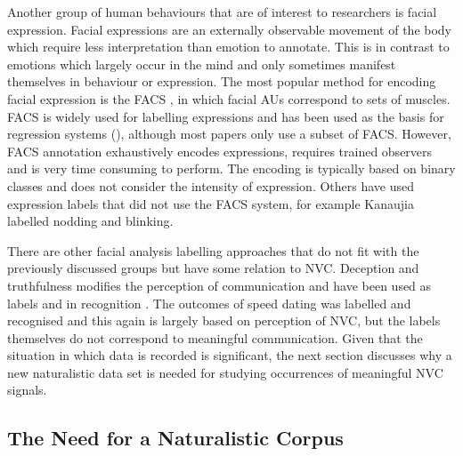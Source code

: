 Another group of human behaviours that are of interest to researchers is facial expression. Facial expressions are an externally observable movement of the body which require less interpretation than emotion to annotate. This is in contrast to emotions which largely occur in the mind and only sometimes manifest themselves in behaviour or expression. 
The most popular method for encoding facial expression is the \acf{FACS} \cite{Ekman1978}, in which facial \acf{AU}s correspond to sets of muscles. \ac{FACS} is widely used for labelling expressions and has been used as the basis for regression systems (\cite{Savran2012}), although most papers only use a subset of \ac{FACS}. However, \ac{FACS} annotation exhaustively encodes expressions, requires trained observers and is very time consuming to perform. The encoding is typically based on binary classes and does not consider the intensity of expression. 
Others have used expression labels that did not use the \ac{FACS} system, for example Kanaujia \etal \cite{Kanaujia2006} labelled nodding and blinking.


There are other facial analysis labelling approaches that do not fit with the previously discussed groups but have some relation to \ac{NVC}. Deception and truthfulness modifies the perception of communication and have been used as labels and in recognition \cite{Tsiamyrtzis07, Pfister2011}. 
The outcomes of speed dating was labelled and recognised \cite{Madan2003} and this again is largely based on perception of \ac{NVC}, but the labels themselves do not correspond to meaningful communication. 
Given that the situation in which data is recorded is significant, the next section discusses why a new naturalistic data set is needed for studying occurrences of meaningful \ac{NVC} signals.

\subsection{The Need for a Naturalistic Corpus}
\label{BackgroundNeedNaturalistic}

